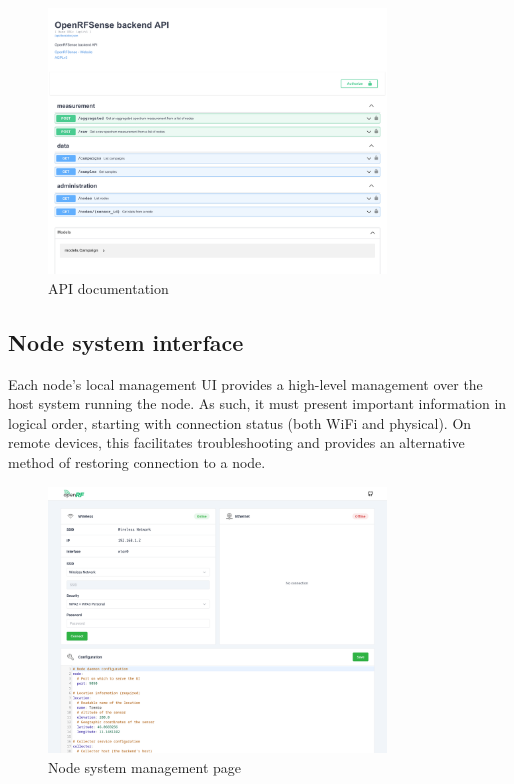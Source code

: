 \documentclass[
  letterpaper,
  a4paper,
  12pt,
  titlepage,
  oneside,
  openany]{book}
\begin{document}
\begin{figure}[h!]

{\centering \includegraphics[width=0.8\textwidth,height=\textheight]{assets/screenshots/api-docs.pdf}

}

\caption{API documentation}

\end{figure}

\newpage{}

\hypertarget{sec-nodeUi}{%
\subsection{Node system interface}\label{sec-nodeUi}}

Each node's local management UI provides a high-level management over
the host system running the node. As such, it must present important
information in logical order, starting with connection status (both WiFi
and physical). On remote devices, this facilitates troubleshooting and
provides an alternative method of restoring connection to a node.

\begin{figure}[h!]

{\centering \includegraphics[width=0.8\textwidth,height=\textheight]{assets/screenshots/node-ui.png}

}

\caption{Node system management page}

\end{figure}
\end{document}
